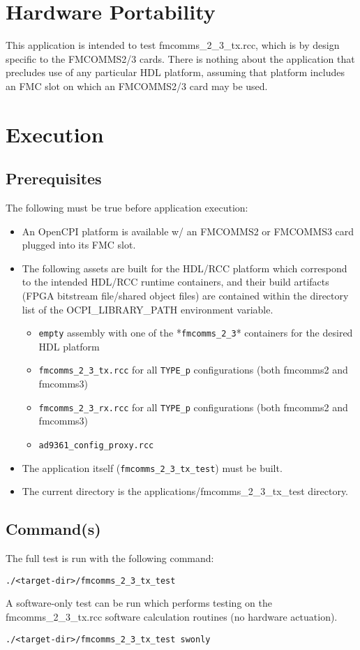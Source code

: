 \section{Hardware Portability}
This application is intended to test fmcomms\_2\_3\_tx.rcc, which is by design specific to the FMCOMMS2/3 cards. There is nothing about the application that precludes use of any particular HDL platform, assuming that platform includes an FMC slot on which an FMCOMMS2/3 card may be used.

\section{Execution}
\subsection{Prerequisites}
The following must be true before application execution:
\begin{itemize}
  \item An OpenCPI platform is available w/ an FMCOMMS2 or FMCOMMS3 card plugged into its FMC slot.
  \item The following assets are built for the HDL/RCC platform which correspond to the intended HDL/RCC runtime containers, and their build artifacts (FPGA bitstream file/shared object files) are contained within the directory list of the OCPI\_LIBRARY\_PATH environment variable.
  \begin{itemize}
    \item \verb+empty+ assembly with one of the *\verb+fmcomms_2_3+* containers for the desired HDL platform
    \item \verb+fmcomms_2_3_tx.rcc+ for all \verb+TYPE_p+ configurations (both fmcomms2 and fmcomms3)
    \item \verb+fmcomms_2_3_rx.rcc+ for all \verb+TYPE_p+ configurations (both fmcomms2 and fmcomms3)
    \item \verb+ad9361_config_proxy.rcc+
  \end{itemize}
  \item The application itself (\verb+fmcomms_2_3_tx_test+) must be built.
  \item The current directory is the applications/fmcomms\_2\_3\_tx\_test directory.
\end{itemize}
\subsection{Command(s)}
The full test is run with the following command:
\begin{lstlisting}
./<target-dir>/fmcomms_2_3_tx_test
\end{lstlisting}
A software-only test can be run which performs testing on the fmcomms\_2\_3\_tx.rcc software calculation routines (no hardware actuation).
\begin{lstlisting}
./<target-dir>/fmcomms_2_3_tx_test swonly
\end{lstlisting}
